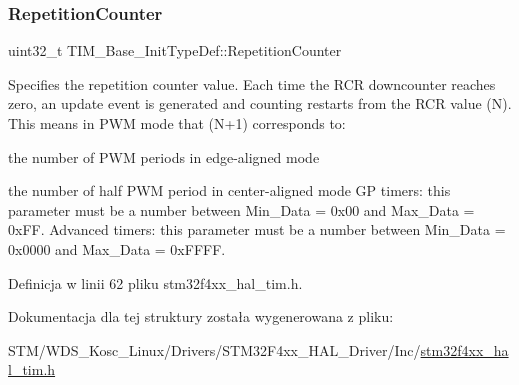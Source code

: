 \subsubsection{\texorpdfstring{Repetition\+Counter}{RepetitionCounter}}
{\footnotesize\ttfamily uint32\+\_\+t T\+I\+M\+\_\+\+Base\+\_\+\+Init\+Type\+Def\+::\+Repetition\+Counter}

Specifies the repetition counter value. Each time the R\+CR downcounter reaches zero, an update event is generated and counting restarts from the R\+CR value (N). This means in P\+WM mode that (N+1) corresponds to\+:
\begin{DoxyItemize}
\item the number of P\+WM periods in edge-\/aligned mode
\item the number of half P\+WM period in center-\/aligned mode GP timers\+: this parameter must be a number between Min\+\_\+\+Data = 0x00 and Max\+\_\+\+Data = 0x\+FF. Advanced timers\+: this parameter must be a number between Min\+\_\+\+Data = 0x0000 and Max\+\_\+\+Data = 0x\+F\+F\+FF. 
\end{DoxyItemize}

Definicja w linii 62 pliku stm32f4xx\+\_\+hal\+\_\+tim.\+h.



Dokumentacja dla tej struktury została wygenerowana z pliku\+:\begin{DoxyCompactItemize}
\item 
S\+T\+M/\+W\+D\+S\+\_\+\+Kosc\+\_\+\+Linux/\+Drivers/\+S\+T\+M32\+F4xx\+\_\+\+H\+A\+L\+\_\+\+Driver/\+Inc/\hyperlink{stm32f4xx__hal__tim_8h}{stm32f4xx\+\_\+hal\+\_\+tim.\+h}\end{DoxyCompactItemize}
